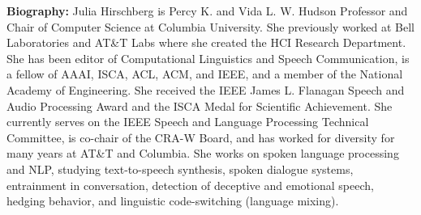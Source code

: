 \vspace{3em}\par 

\vfill
\noindent

{\bfseries Biography:} Julia Hirschberg is Percy K. and Vida L. W. Hudson Professor and Chair of Computer Science at Columbia University. She previously worked at Bell Laboratories and AT&T Labs where she created the HCI Research Department. She has been editor of Computational Linguistics and Speech Communication, is a fellow of AAAI, ISCA, ACL, ACM, and IEEE, and a member of the National Academy of Engineering. She received the IEEE James L. Flanagan Speech and Audio Processing Award and the ISCA Medal for Scientific Achievement. She currently serves on the IEEE Speech and Language Processing Technical Committee, is co-chair of the CRA-W Board, and has worked for diversity for many years at AT&T and Columbia. She works on spoken language processing and NLP, studying text-to-speech synthesis, spoken dialogue systems, entrainment in conversation, detection of deceptive and emotional speech, hedging behavior, and linguistic code-switching (language mixing).
\newpage

